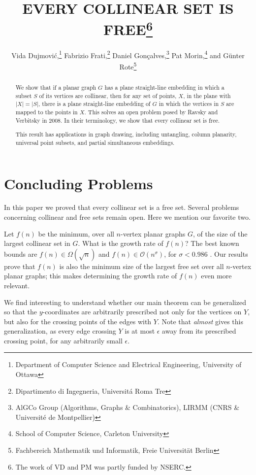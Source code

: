 \documentclass{patmorin}
\title{\MakeUppercase{Every Collinear Set Is Free}\thanks{%
    The work of VD and PM was partly funded by NSERC.}}
\author{Vida Dujmovi\'c,\thanks{Department of Computer Science and Electrical Engineering, University of Ottawa}\quad
        Fabrizio Frati,\thanks{Dipartimento di Ingegneria, Universit\'a Roma Tre}\quad 
        Daniel Gon\c{c}alves,\thanks{AlGCo Group (Algorithms, Graphs \& Combinatorics), LIRMM (CNRS \& Universit\'{e} de Montpellier)}\quad
        Pat Morin,\thanks{School of Computer Science, Carleton University}\quad 
        and G\"unter Rote\thanks{Fachbereich Mathematik und Informatik, Freie Universit\"at Berlin}}
\begin{document}
\maketitle


\begin{abstract}
  We show that if a planar graph $G$ has a plane straight-line embedding
  in which a subset $S$ of its vertices are collinear, then for any
  set of points, $X$, in the plane with $|X|=|S|$, there is a plane straight-line
  embedding of $G$ in which the vertices in $S$ are mapped to the points
  in $X$.  This solves an open problem posed by Ravsky and Verbitsky in
  2008.  In their terminology, we show that every collinear set is free.
  
  This result has applications in graph drawing, including untangling,
  column planarity, universal point subsets, and partial simultaneous
  embeddings.
\end{abstract}






\section{Concluding Problems}

In this paper we proved that every collinear set is a free set. Several problems concerning collinear and free sets remain open. Here we mention our favorite two.

Let $f(n)$ be the minimum, over all $n$-vertex planar graphs $G$, of the size of the largest collinear set in $G$. What is the growth rate of $f(n)$? The best known bounds are $f(n)\in\Omega(\sqrt{n})$ and $f(n)\in \mathcal{O}(n^\sigma)$, for $\sigma < 0.986$ \cite{bose.dujmovic.ea:polynomial,ravsky.verbitsky:on}. Our results prove that $f(n)$ is also the minimum size of the largest free set over all $n$-vertex planar graphs; this makes determining the growth rate of $f(n)$ even more relevant.
%

We find interesting to understand whether our main theorem can be generalized so that the $y$-coordinates are arbitrarily prescribed not only for the vertices on $Y$, but also for the crossing points of the edges with $Y$. Note that  {\em almost} gives this generalization, as every edge crossing $Y$ is at most $\epsilon$ away from its prescribed crossing point, for any arbitrarily small $\epsilon$. 
\end{document}
